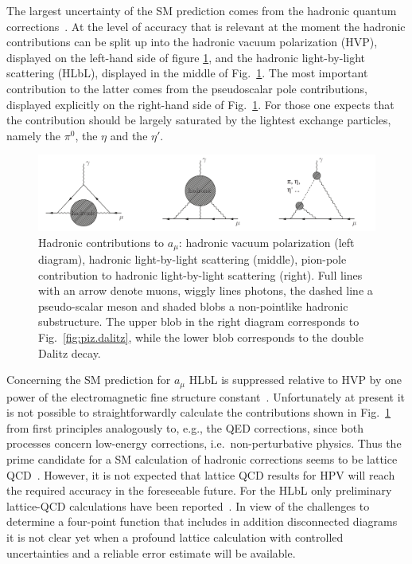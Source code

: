 The largest uncertainty of the SM prediction comes from
the hadronic quantum corrections~\cite{Jegerlehner:2009ry}.
At the level of accuracy that is relevant at the moment the hadronic
contributions can be split up into the hadronic vacuum polarization
(HVP), displayed on the left-hand side of figure \ref{fig:gm2}, and the
hadronic light-by-light scattering (HLbL), displayed in the middle of
Fig.~\ref{fig:gm2}. The most important contribution to the latter
comes from the pseudoscalar pole contributions, displayed explicitly on the right-hand 
side of Fig.~\ref{fig:gm2}. For those one expects that the contribution
should be largely saturated by the lightest exchange particles, namely the 
$\pi^0$, the $\eta$ and the $\eta'$. 
%
\begin{figure}[!h]
	\includegraphics[keepaspectratio,width=1.\textwidth]{figures/intro/hadronicgm2.pdf}
	\caption{Hadronic contributions to $a_\mu$: hadronic vacuum polarization (left diagram), 
		hadronic light-by-light scattering (middle), pion-pole contribution to hadronic light-by-light scattering (right). Full lines with an arrow denote muons, wiggly lines photons, the dashed line a pseudo-scalar meson and shaded blobs a non-pointlike hadronic substructure. The upper blob in the right diagram corresponds to Fig.~\ref{fig:piz.dalitz}, while the lower blob corresponds to the double Dalitz decay. 
	}
	\label{fig:gm2}
\end{figure}

Concerning the SM prediction for $a_\mu$ HLbL is suppressed relative to HVP by one power of the electromagnetic
fine structure constant~\cite{Jegerlehner:2009ry,Bijnens:2007pz}.  
Unfortunately at present it is not possible to straightforwardly 
calculate the contributions shown in Fig.~\ref{fig:gm2} 
from first principles analogously to, e.g., the QED corrections, since
both processes concern low-energy corrections,
i.e.\ non-perturbative physics. Thus the prime candidate for a SM
calculation of hadronic corrections seems to be lattice QCD~\cite{Gattringer:2010zz}. 
However, it is not expected that lattice QCD
results for HPV will reach the required accuracy in the foreseeable future.
For the HLbL only preliminary lattice-QCD calculations have been reported~\cite{Blum:2014oka}.  
In view of the challenges to determine
a four-point function that includes in addition disconnected diagrams
it is not clear yet when a profound lattice calculation with
controlled uncertainties and a reliable error estimate will be
available.

